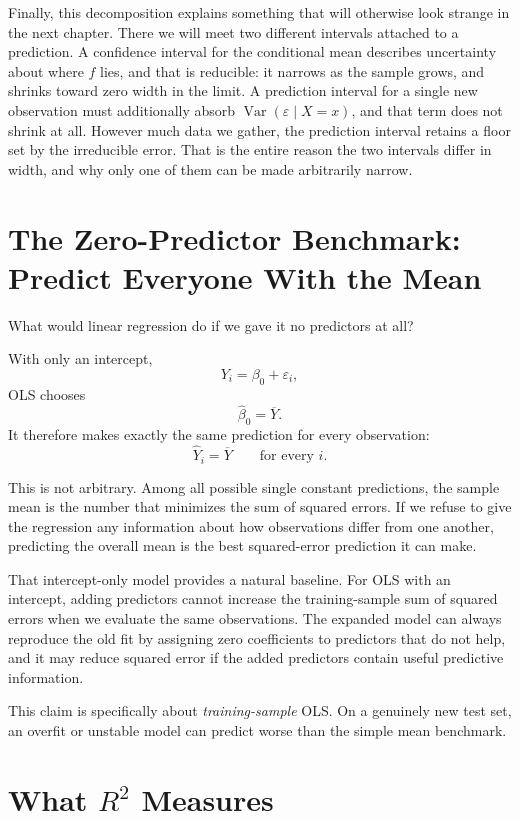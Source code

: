 \documentclass[11pt]{report}
\newcommand{\Var}{\operatorname{Var}}
\begin{document}
Finally, this decomposition explains something that will otherwise look strange in the next chapter. There we will meet two different intervals attached to a prediction. A confidence interval for the conditional mean describes uncertainty about where \(f\) lies, and that is reducible: it narrows as the sample grows, and shrinks toward zero width in the limit. A prediction interval for a single new observation must additionally absorb \(\Var(\varepsilon\mid X=x)\), and that term does not shrink at all. However much data we gather, the prediction interval retains a floor set by the irreducible error. That is the entire reason the two intervals differ in width, and why only one of them can be made arbitrarily narrow.

\section{The Zero-Predictor Benchmark: Predict Everyone With the Mean}

What would linear regression do if we gave it no predictors at all?

With only an intercept,
\[
Y_i=\beta_0+\varepsilon_i,
\]
OLS chooses
\[
\widehat{\beta}_0=\overline{Y}.
\]
It therefore makes exactly the same prediction for every observation:
\[
\widehat{Y}_i=\overline{Y}
\qquad\text{for every }i.
\]

This is not arbitrary. Among all possible single constant predictions, the sample mean is the number that minimizes the sum of squared errors. If we refuse to give the regression any information about how observations differ from one another, predicting the overall mean is the best squared-error prediction it can make.

That intercept-only model provides a natural baseline. For OLS with an intercept, adding predictors cannot increase the training-sample sum of squared errors when we evaluate the same observations. The expanded model can always reproduce the old fit by assigning zero coefficients to predictors that do not help, and it may reduce squared error if the added predictors contain useful predictive information.

This claim is specifically about \emph{training-sample} OLS. On a genuinely new test set, an overfit or unstable model can predict worse than the simple mean benchmark.

\section{What \(R^2\) Measures}
\end{document}
